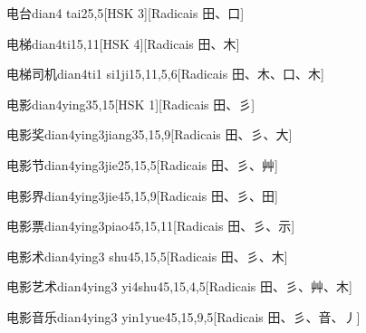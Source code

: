 \begin{entry}{电台}{dian4 tai2}{5,5}[HSK 3][Radicais ⽥、⼝]
\end{entry}

\begin{entry}{电梯}{dian4ti1}{5,11}[HSK 4][Radicais ⽥、⽊]
\end{entry}

\begin{entry}{电梯司机}{dian4ti1 si1ji1}{5,11,5,6}[Radicais ⽥、⽊、⼝、⽊]
\end{entry}

\begin{entry}{电影}{dian4ying3}{5,15}[HSK 1][Radicais ⽥、⼺]
\end{entry}

\begin{entry}{电影奖}{dian4ying3jiang3}{5,15,9}[Radicais ⽥、⼺、⼤]
\end{entry}

\begin{entry}{电影节}{dian4ying3jie2}{5,15,5}[Radicais ⽥、⼺、⾋]
\end{entry}

\begin{entry}{电影界}{dian4ying3jie4}{5,15,9}[Radicais ⽥、⼺、⽥]
\end{entry}

\begin{entry}{电影票}{dian4ying3piao4}{5,15,11}[Radicais ⽥、⼺、⽰]
\end{entry}

\begin{entry}{电影术}{dian4ying3 shu4}{5,15,5}[Radicais ⽥、⼺、⽊]
\end{entry}

\begin{entry}{电影艺术}{dian4ying3 yi4shu4}{5,15,4,5}[Radicais ⽥、⼺、⾋、⽊]
\end{entry}

\begin{entry}{电影音乐}{dian4ying3 yin1yue4}{5,15,9,5}[Radicais ⽥、⼺、⾳、⼃]
\end{entry}

